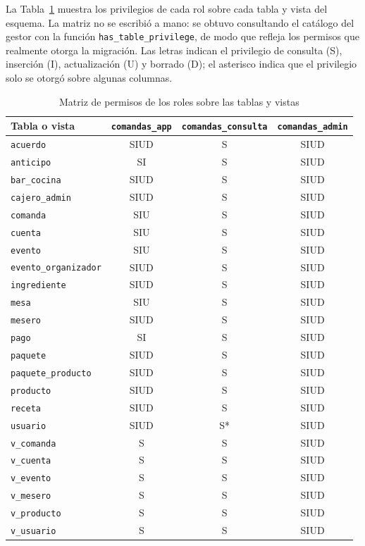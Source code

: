 La Tabla~\ref{tab:matriz-permisos} muestra los privilegios de cada rol sobre cada tabla y vista del esquema. La matriz no se escribió a mano: se obtuvo consultando el catálogo del gestor con la función \texttt{has\_table\_privilege}, de modo que refleja los permisos que realmente otorga la migración. Las letras indican el privilegio de consulta (S), inserción (I), actualización (U) y borrado (D); el asterisco indica que el privilegio solo se otorgó sobre algunas columnas.

\begin{table}[H]
    \centering
    \small
    \begin{tabular}{lccc}
        \toprule
        \textbf{Tabla o vista} & \texttt{comandas\_app} & \texttt{comandas\_consulta} & \texttt{comandas\_admin} \\
        \midrule
        \texttt{acuerdo} & SIUD & S & SIUD \\
        \texttt{anticipo} & SI & S & SIUD \\
        \texttt{bar\_cocina} & SIUD & S & SIUD \\
        \texttt{cajero\_admin} & SIUD & S & SIUD \\
        \texttt{comanda} & SIU & S & SIUD \\
        \texttt{cuenta} & SIU & S & SIUD \\
        \texttt{evento} & SIU & S & SIUD \\
        \texttt{evento\_organizador} & SIUD & S & SIUD \\
        \texttt{ingrediente} & SIUD & S & SIUD \\
        \texttt{mesa} & SIU & S & SIUD \\
        \texttt{mesero} & SIUD & S & SIUD \\
        \texttt{pago} & SI & S & SIUD \\
        \texttt{paquete} & SIUD & S & SIUD \\
        \texttt{paquete\_producto} & SIUD & S & SIUD \\
        \texttt{producto} & SIUD & S & SIUD \\
        \texttt{receta} & SIUD & S & SIUD \\
        \texttt{usuario} & SIUD & S* & SIUD \\
        \midrule
        \texttt{v\_comanda} & S & S & SIUD \\
        \texttt{v\_cuenta} & S & S & SIUD \\
        \texttt{v\_evento} & S & S & SIUD \\
        \texttt{v\_mesero} & S & S & SIUD \\
        \texttt{v\_producto} & S & S & SIUD \\
        \texttt{v\_usuario} & S & S & SIUD \\
        \bottomrule
    \end{tabular}
    \captionsetup{labelfont=bf, textfont=it, labelsep=newline, justification=raggedright, singlelinecheck=false}
    \caption{Matriz de permisos de los roles sobre las tablas y vistas}
    \label{tab:matriz-permisos}
\end{table}

